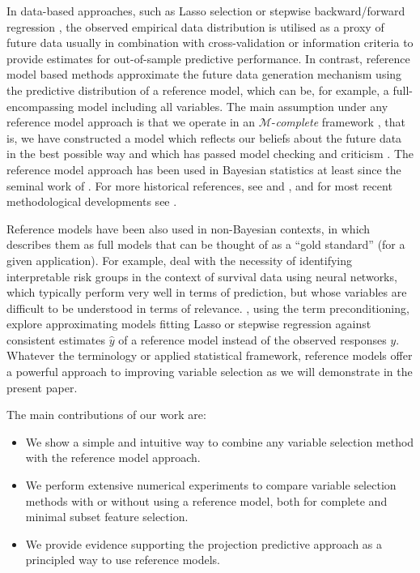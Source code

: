 \documentclass[a4]{article}
\theoremstyle{definition}
\begin{document}
In data-based approaches, such as Lasso selection
\citep{tibshirani1996regression} or stepwise backward/forward
regression \citep{venables2013modern,harrell2015regression}, the
observed empirical data distribution is utilised as a proxy of future
data usually in combination with cross-validation or information
criteria to provide estimates for out-of-sample predictive
performance.  In contrast, reference model based methods approximate
the future data generation mechanism using the predictive distribution
of a reference model, which can be, for example, a full-encompassing
model including all variables.  The main assumption under any
reference model approach is that we operate in an
$\mathcal{M}$-\textit{complete} framework
\citep{book:bernardo_smith,vehtari2012survey}, that is, we have
constructed a model which reflects our beliefs about
the future data in the best possible way and which has passed model checking and criticism
\citep[see, e.g.][]{gelman2013bayesian,gabry2019visualization}.  The reference model approach
has been used in Bayesian statistics at least since the seminal
work of \citet{paper:reference_lindley}. For more historical
references, see \citet{vehtari2012survey} and
\citet{paper:model_selection}, and for most recent methodological
developments see \citet{paper:projpred}.

Reference models have been also used in non-Bayesian contexts, in which
\cite{harrell2015regression} describes them as full models that can be
thought of as a ``gold standard'' (for a given application).  For
example, \cite{faraggi2001understanding} deal with the necessity of
identifying interpretable risk groups in the context of survival data
using neural networks, which typically perform very well in terms of
prediction, but whose variables are difficult to be understood in
terms of relevance.  \cite{paul2008preconditioning}, using the term
preconditioning, explore approximating models fitting Lasso or
stepwise regression against consistent estimates $\hat{y}$ of a
reference model instead of the observed responses $y$.
Whatever the terminology or applied statistical framework, reference
models offer a powerful approach to improving variable selection as we
will demonstrate in the present paper.

The main contributions of our work are:

\begin{itemize}
\item We show a simple and intuitive way to combine any variable selection method with the reference model approach.
\item We perform extensive numerical experiments to compare variable selection methods with or without using a reference model, both for complete and minimal subset feature selection.
\item We provide evidence supporting the projection predictive approach as a principled way to use reference models.
\end{itemize}
\end{document}
